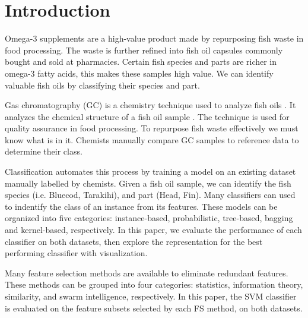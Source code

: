 \documentclass[runningheads]{llncs}
\begin{document}
\section{Introduction}
\label{introduction}


Omega-3 supplements are a high-value product made by repurposing fish waste in food processing. 
The waste is further refined into fish oil capsules commonly bought and sold at pharmacies. 
Certain fish species and parts are richer in omega-3 fatty acids, this makes these samples high value. 
We can identify valuable fish oils by classifying their species and part.

Gas chromatography (GC) is a chemistry technique used to analyze fish oils \cite{eder1995gas}. 
It analyzes the chemical structure of a fish oil sample \cite{restek2018high}. 
The technique is used for quality assurance in food processing. 
To repurpose fish waste effectively we must know what is in it. 
Chemists manually compare GC samples to reference data to determine their class. 

Classification automates this process by training a model on an existing dataset manually labelled by chemists. 
Given a fish oil sample, we can identify the fish species (i.e. Bluecod, Tarakihi), and part (Head, Fin).
Many classifiers \cite{fix1989discriminatory,hand2001idiot,ho1995random,loh2011classification,cortes1995support} can used to indentify the class of an instance from its features. 
These models can be organized into five categories: instance-based, probabilistic, tree-based, bagging and kernel-based, respectively. 
In this paper, we evaluate the performance of each classifier on both datasets, then explore the representation for the best performing classifier \cite{kennedy1995particle} with visualization. 

Many feature selection methods \cite{liu1995chi2,ding2005minimum,kononenko1994estimating,kennedy1995particle} are available to eliminate redundant features. 
These methods can be grouped into four categories: statistics, information theory, similarity, and swarm intelligence, respectively. 
In this paper, the SVM classifier \cite{cortes1995support} is evaluated on the feature subsets selected by each FS method, on both datasets. 
\end{document}
